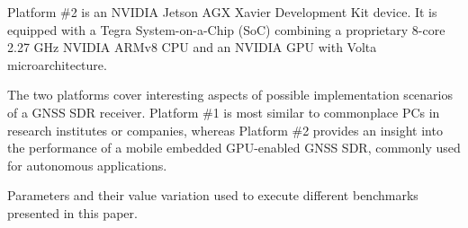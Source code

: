 \documentclass{juliacon}
\begin{document}
Platform \#2 is an NVIDIA Jetson AGX Xavier Development Kit device. It is equipped with a Tegra System-on-a-Chip (SoC) combining a proprietary 8-core 2.27 GHz NVIDIA ARMv8 CPU and an NVIDIA GPU with Volta microarchitecture. 

The two platforms cover interesting aspects of possible implementation scenarios of a GNSS SDR receiver. Platform \#1 is most similar to commonplace PCs in research institutes or companies, whereas Platform \#2 provides an insight into the performance of a mobile embedded GPU-enabled GNSS SDR, commonly used for autonomous applications.

\begin{table}[t]
    \centering
    \caption{\label{tab:platforms} Parameters and their value variation used to execute different benchmarks presented in this paper.}


\end{table}
\end{document}
